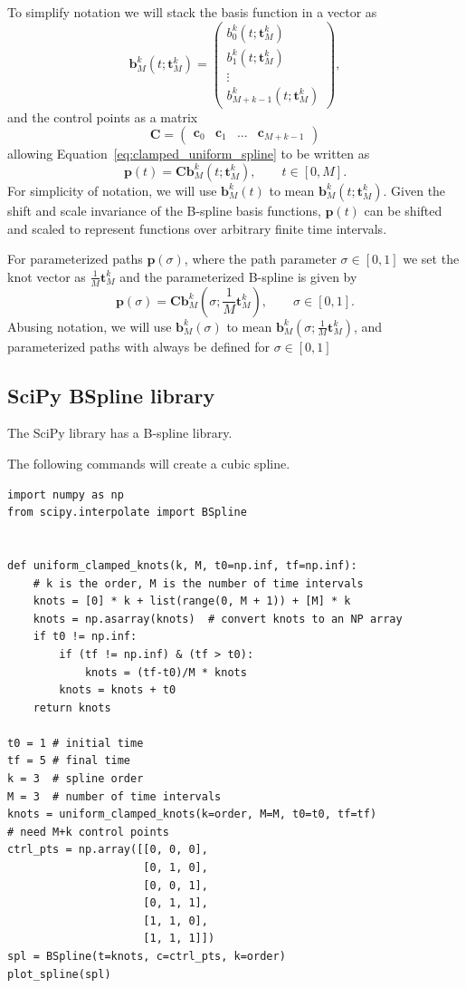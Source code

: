 \documentclass{article}
\newcommand{\bbf}{\mathbf{b}}
\newcommand{\cbf}{\mathbf{c}}
\newcommand{\Cbf}{\mathbf{C}}
\begin{document}
To simplify notation we will stack the basis function in a vector as
\begin{equation}\label{eq:basis_vector}
\bbf_M^k(t;\mathbf{t}_M^k) = \begin{pmatrix} b_0^k(t;\mathbf{t}_M^k) \\ b_1^k(t;\mathbf{t}_M^k) \\ \vdots \\ b_{M+k-1}^k(t;\mathbf{t}_M^k) \end{pmatrix}, 
\end{equation}
and the control points as a matrix 
\[
\Cbf = \begin{pmatrix} \cbf_0 & \cbf_1 & \dots & \cbf_{M+k-1} \end{pmatrix}
\]
allowing Equation~\eqref{eq:clamped_uniform_spline} to be written as
\[
\mathbf{p}(t) = \Cbf \bbf_M^k(t; \mathbf{t}_M^k), \qquad t\in[0, M].
\]
For simplicity of notation, we will use $\bbf_M^k(t)$ to mean $\bbf_M^k(t; \mathbf{t}_M^k)$.  Given the shift and scale invariance of the B-spline basis functions, $\mathbf{p}(t)$ can be shifted and scaled to represent functions over arbitrary finite time intervals.

For parameterized paths $\mathbf{p}(\sigma)$, where the path parameter $\sigma\in[0,1]$ we set the knot vector as $\frac{1}{M}\mathbf{t}_{M}^k$
and the parameterized B-spline is given by
\[
\mathbf{p}(\sigma) = \Cbf \bbf_M^k(\sigma; \frac{1}{M}\mathbf{t}_{M}^k), \qquad \sigma\in[0, 1].
\]
Abusing notation, we will use $\bbf_M^k(\sigma)$ to mean $\bbf_M^k(\sigma; \frac{1}{M}\mathbf{t}_{M}^k)$, and parameterized paths with always be defined for $\sigma\in[0,1]$

\subsection{SciPy BSpline library}
The SciPy library has a B-spline library.  

The following commands will create a cubic spline.
\begin{lstlisting}
import numpy as np
from scipy.interpolate import BSpline
	
	
def uniform_clamped_knots(k, M, t0=np.inf, tf=np.inf):
    # k is the order, M is the number of time intervals
    knots = [0] * k + list(range(0, M + 1)) + [M] * k
    knots = np.asarray(knots)  # convert knots to an NP array
    if t0 != np.inf:
        if (tf != np.inf) & (tf > t0):
            knots = (tf-t0)/M * knots
        knots = knots + t0
    return knots	

t0 = 1 # initial time
tf = 5 # final time
k = 3  # spline order
M = 3  # number of time intervals
knots = uniform_clamped_knots(k=order, M=M, t0=t0, tf=tf)
# need M+k control points
ctrl_pts = np.array([[0, 0, 0],  
                     [0, 1, 0],
                     [0, 0, 1],
                     [0, 1, 1],
                     [1, 1, 0],
                     [1, 1, 1]])
spl = BSpline(t=knots, c=ctrl_pts, k=order)
plot_spline(spl)
\end{lstlisting}
\end{document}

